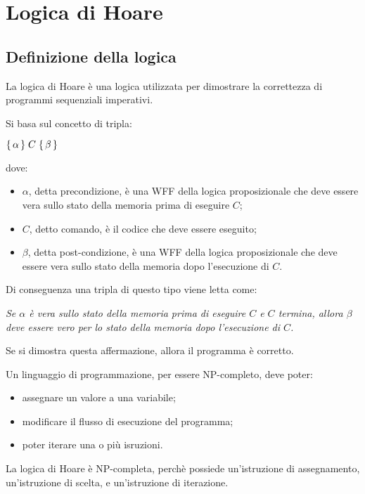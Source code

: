 \chapter{Logica di Hoare}
\section{Definizione della logica}
La logica di Hoare è una logica utilizzata per dimostrare la correttezza di programmi sequenziali imperativi.

Si basa sul concetto di tripla:
\begin{center}
    $\Hoaretriple{\alpha}{C}{\beta}$
\end{center}
dove:
\begin{itemize}
    \item $\alpha$, detta precondizione, è una WFF della logica proposizionale che deve essere vera sullo stato della memoria prima di eseguire $C$;
    \item $C$, detto comando, è il codice che deve essere eseguito;
    \item $\beta$, detta post-condizione, è una WFF della logica proposizionale che deve essere vera sullo stato della memoria dopo l'esecuzione di $C$.
\end{itemize}
Di conseguenza una tripla di questo tipo viene letta come:
\begin{center}
    \textit{Se $\alpha$ è vera sullo stato della memoria prima di eseguire $C$ e $C$ termina, allora $\beta$ deve essere vero per lo stato della memoria dopo l'esecuzione di $C$.}
\end{center}
Se si dimostra questa affermazione, allora il programma  è corretto.

Un linguaggio di programmazione, per essere NP-completo, deve poter:
\begin{itemize}
    \item assegnare un valore a una variabile;
    \item modificare il flusso di esecuzione del programma;
    \item poter iterare una o più isruzioni.
\end{itemize}
La logica di Hoare è NP-completa, perchè possiede un'istruzione di assegnamento, un'istruzione di scelta, e un'istruzione di iterazione. 

